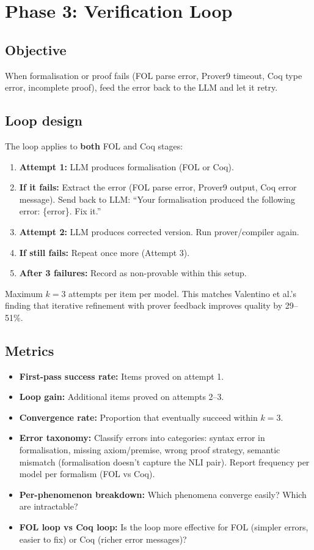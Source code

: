 \documentclass[11pt,a4paper]{article}
\begin{document}
\section{Phase 3: Verification Loop}

\subsection{Objective}

When formalisation or proof fails (FOL parse error, Prover9 timeout, Coq type error, incomplete proof), feed the error back to the LLM and let it retry.

\subsection{Loop design}

The loop applies to \textbf{both} FOL and Coq stages:

\begin{enumerate}[nosep,leftmargin=1.5em]
\item \textbf{Attempt 1:} LLM produces formalisation (FOL or Coq).
\item \textbf{If it fails:} Extract the error (FOL parse error, Prover9 output, Coq error message). Send back to LLM: ``Your formalisation produced the following error: \{error\}. Fix it.''
\item \textbf{Attempt 2:} LLM produces corrected version. Run prover/compiler again.
\item \textbf{If still fails:} Repeat once more (Attempt 3).
\item \textbf{After 3 failures:} Record as non-provable within this setup.
\end{enumerate}

Maximum $k = 3$ attempts per item per model. This matches Valentino et al.'s finding that iterative refinement with prover feedback improves quality by 29--51\%.

\subsection{Metrics}

\begin{itemize}[nosep,leftmargin=1.5em]
\item \textbf{First-pass success rate:} Items proved on attempt 1.
\item \textbf{Loop gain:} Additional items proved on attempts 2--3.
\item \textbf{Convergence rate:} Proportion that eventually succeed within $k = 3$.
\item \textbf{Error taxonomy:} Classify errors into categories: syntax error in formalisation, missing axiom/premise, wrong proof strategy, semantic mismatch (formalisation doesn't capture the NLI pair). Report frequency per model per formalism (FOL vs Coq).
\item \textbf{Per-phenomenon breakdown:} Which phenomena converge easily? Which are intractable?
\item \textbf{FOL loop vs Coq loop:} Is the loop more effective for FOL (simpler errors, easier to fix) or Coq (richer error messages)?
\end{itemize}
\end{document}
